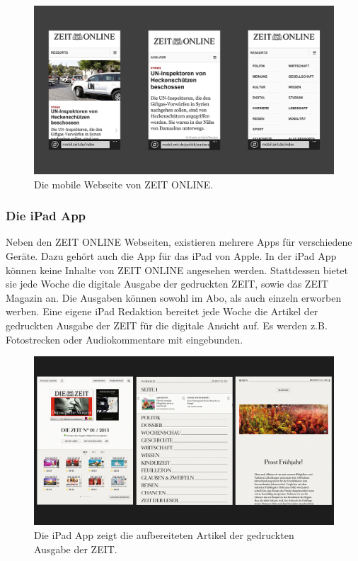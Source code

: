 \documentclass[12pt,a4paper,bibtotoc,abstracton]{scrartcl}
\begin{document}
\begin{figure}[h]	
	\centering
	\includegraphics[width=\textwidth]{Bilder/Screenshots/mobil.zeit.de/mobile.png} 
	\caption{Die mobile Webseite von ZEIT ONLINE.}
	\label{fig:mobilehomepage}
\end{figure}

\subsubsection{Die iPad App}
\label{subsubsec:ipadapp}
Neben den ZEIT ONLINE Webseiten, existieren mehrere Apps für verschiedene Geräte. Dazu gehört auch die App für das iPad von Apple. In der iPad App können keine Inhalte von ZEIT ONLINE angesehen werden. Stattdessen bietet sie jede Woche die digitale Ausgabe der gedruckten ZEIT, sowie das ZEIT Magazin an. Die Ausgaben können sowohl im Abo, als auch einzeln erworben werben. Eine eigene iPad Redaktion bereitet jede Woche die Artikel der gedruckten Ausgabe der ZEIT für die digitale Ansicht auf. Es werden z.B. Fotostrecken oder Audiokommentare mit eingebunden.  

\begin{figure}[h]	
	\centering
	\includegraphics[width=\textwidth]{Bilder/Screenshots/iPadApp/ipad1.png} 
	\caption{Die iPad App zeigt die aufbereiteten Artikel der gedruckten Ausgabe der ZEIT.}
	\label{fig:ipad1}
\end{figure}
\end{document}
